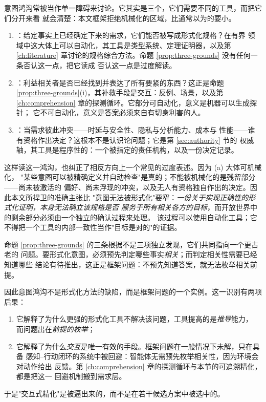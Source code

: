 \begin{remark}\label{rmk:three-questions}
意图鸿沟常被当作单一障碍来讨论。它其实是三个，它们需要不同的工具，而把它们分开来看
就会清楚：本文框架拒绝机械化的区域，比通常以为的要小。

\begin{enumerate}[label=(\alph*)]
\item {}：给定事实上已经确定下来的需求，它们能否被写成形式化规格？在有界
      领域中这大体上可以自动化，其工具是类型系统、定理证明器，以及第 \ref{ch:literature}
      章讨论的规格综合方法。命题 \ref{prop:three-grounds} 没有任何一条否认这一点，把它读成
      否认这一点是过度解读。
\item {}：利益相关者是否已经找到并表达了所有要紧的东西？这正是命题
      \ref{prop:three-grounds}(i)，其补救手段是交互：反例、场景，以及第
      \ref{ch:comprehension} 章的探测循环。它部分可自动化，意义是机器可以生成探针；
      它不可自动化，意义是答案必须来自有切身利害的人。
\item {}：当需求彼此冲突——时延与安全性、隐私与分析能力、成本与
      性能——谁有资格作出决定？这根本不是认识论问题；它是第 \ref{sec:authority} 节的
      权威轴，其工具是程序性的：一个被指定的责任机构，以及一份决定记录。
\end{enumerate}
这样读这一鸿沟，也纠正了相反方向上一个常见的过度表述。因为 (a) 大体可机械化，
"某些意图可以被精确定义并自动检查"是真的；不能被机械化的是残留部分——尚未被激活的
偏好、尚未浮现的冲突，以及无人有资格独自作出的决定。因此本文所捍卫的准确主张比
"意图无法被形式化"要窄：\emph{一份关于实现正确性的形式化证明，本身无法确立该规格是否
服务于所有相关各方的目标}，而开放世界中的剩余部分必须由一个独立的确认过程来处理。
该过程可以使用自动化工具；它不得把一个工具的内部一致性当作"目标是对的"的证据。
\end{remark}

\begin{remark}[意图鸿沟是框架问题]\label{rmk:frame}
命题 \ref{prop:three-grounds} 的三条根据不是三项独立发现，它们共同指向一个更古老的
问题。要形式化意图，必须预先判定哪些事实\emph{相关}；而判定相关性需要已经知道哪些
结论有待推出，这正是框架问题：不预先知道答案，就无法枚举相关前提。

因此意图鸿沟不是形式化方法的缺陷，而是框架问题的一个实例。这一识别有两项后果：
\begin{enumerate}[label=(\alph*)]
\item 它解释了为什么更强的形式化工具不解决该问题，工具提高的是\emph{推导}能力，
      而问题出在\emph{前提的枚举}；
\item 它解释了为什么\emph{交互}是唯一有效的手段。框架问题在一般情况下未解，只在具备
      感知--行动闭环的系统中被回避：智能体无需预先枚举相关性，因为环境会对动作给出
      反馈。第 \ref{ch:comprehension} 章的探测循环与本节的可追溯精化，都是把这一
      回避机制搬到需求层。
\end{enumerate}
于是"交互式精化"是被逼出来的，而不是在若干候选方案中被选中的。
\end{remark}


